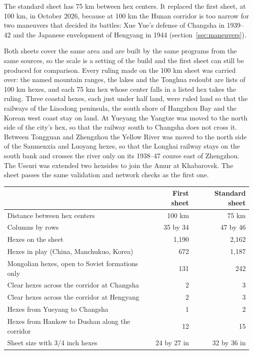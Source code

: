 The standard sheet has 75 km between hex centers. It replaced the first sheet, at 100 km, in October 2026, because at 100 km the Hunan corridor is too narrow for two maneuvers that decided its battles: Xue Yue's defense of Changsha in 1939--42 and the Japanese envelopment of Hengyang in 1944 (section~\ref{sec:maneuvers}).

Both sheets cover the same area and are built by the same programs from the same sources, so the scale is a setting of the build and the first sheet can still be produced for comparison. Every ruling made on the 100 km sheet was carried over: the named mountain ranges, the lakes and the Tonghua redoubt are lists of 100 km hexes, and each 75 km hex whose center falls in a listed hex takes the ruling. Three coastal hexes, each just under half land, were ruled land so that the railways of the Liaodong peninsula, the south shore of Hangzhou Bay and the Korean west coast stay on land. At Yueyang the Yangtze was moved to the north side of the city's hex, so that the railway south to Changsha does not cross it. Between Tongguan and Zhengzhou the Yellow River was moved to the north side of the Sanmenxia and Luoyang hexes, so that the Longhai railway stays on the south bank and crosses the river only on its 1938--47 course east of Zhengzhou. The Ussuri was extended two hexsides to join the Amur at Khabarovsk. The sheet passes the same validation and network checks as the first one.

\begin{center}
\begin{tabular}{lrr}
\toprule & First sheet & Standard sheet \\\midrule
Distance between hex centers & 100 km & 75 km \\
Columns by rows & 35 by 34 & 47 by 46 \\
Hexes on the sheet & 1,190 & 2,162 \\
Hexes in play (China, Manchukuo, Korea) & 672 & 1,187 \\
Mongolian hexes, open to Soviet formations only & 131 & 242 \\
Clear hexes across the corridor at Changsha & 2 & 3 \\
Clear hexes across the corridor at Hengyang & 2 & 3 \\
Hexes from Yueyang to Changsha & 1 & 2 \\
Hexes from Hankow to Dushan along the corridor & 12 & 15 \\
Sheet size with 3/4 inch hexes & 24 by 27 in & 32 by 36 in \\
\bottomrule
\end{tabular}
\end{center}

